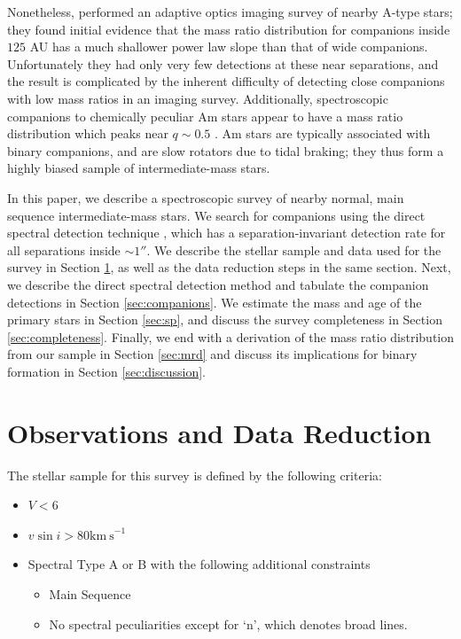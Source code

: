 \documentclass{emulateapj}
\begin{document}
Nonetheless, \citet{DeRosa2014} performed an adaptive optics imaging survey of nearby A-type stars; they found initial evidence that the mass ratio distribution for companions inside $125$ AU has a much shallower power law slope than that of wide companions. Unfortunately they had only very few detections at these near separations, and the result is complicated by the inherent difficulty of detecting close companions with low mass ratios in an imaging survey. Additionally, spectroscopic companions to chemically peculiar Am stars appear to have a mass ratio distribution which peaks near $q \sim 0.5$ \citep{Vuissoz2004}. Am stars are typically associated with binary companions, and are slow rotators due to tidal braking; they thus form a highly biased sample of intermediate-mass stars.

In this paper, we describe a spectroscopic survey of nearby normal, main sequence intermediate-mass stars. We search for companions using the direct spectral detection technique \citep{Gullikson2016}, which has a separation-invariant detection rate for all separations inside $\sim 1 ''$. We describe the stellar sample and data used for the survey in Section \ref{sec:obs}, as well as the data reduction steps in the same section. Next, we describe the direct spectral detection method and tabulate the companion detections in Section \ref{sec:companions}. We estimate the mass and age of the primary stars in Section \ref{sec:sp}, and discuss the survey completeness in Section \ref{sec:completeness}. Finally, we end with a derivation of the mass ratio distribution from our sample in Section \ref{sec:mrd} and discuss its implications for binary formation in Section \ref{sec:discussion}.
 


\section{Observations and Data Reduction}
\label{sec:obs}

The stellar sample for this survey is defined by the following criteria:

\begin{itemize}
\item $V < 6$
\item $v\sin{i} > 80 \mathrm{km\ s}^{-1}$
\item Spectral Type A or B with the following additional constraints
\begin{itemize}
  \item Main Sequence
  \item No spectral peculiarities except for `n', which denotes broad lines.
\end{itemize}
\end{itemize}
\end{document}

